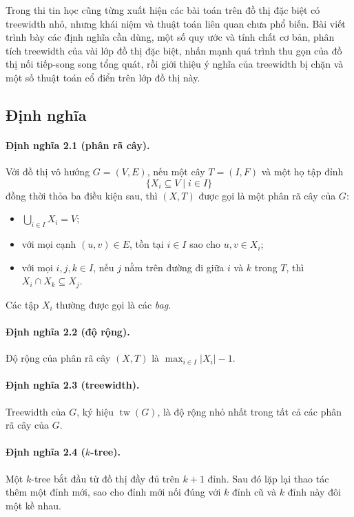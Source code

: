 \documentclass[11pt]{article}
\begin{document}
Trong thi tin học cũng từng xuất hiện các bài toán trên đồ thị đặc biệt có
treewidth nhỏ, nhưng khái niệm và thuật toán liên quan chưa phổ biến. Bài viết
trình bày các định nghĩa cần dùng, một số quy ước và tính chất cơ bản, phân
tích treewidth của vài lớp đồ thị đặc biệt, nhấn mạnh quá trình thu gọn của đồ
thị nối tiếp-song song tổng quát, rồi giới thiệu ý nghĩa của treewidth bị chặn
và một số thuật toán cổ điển trên lớp đồ thị này.

\subsection{Định nghĩa}

\paragraph{Định nghĩa 2.1 (phân rã cây).}
Với đồ thị vô hướng $G=(V,E)$, nếu một cây $T=(I,F)$ và một họ tập đỉnh
\[
  \{X_i\subseteq V\mid i\in I\}
\]
đồng thời thỏa ba điều kiện sau, thì $(X,T)$ được gọi là một phân rã cây của
$G$:
\begin{itemize}
  \item $\bigcup_{i\in I}X_i=V$;
  \item với mọi cạnh $(u,v)\in E$, tồn tại $i\in I$ sao cho $u,v\in X_i$;
  \item với mọi $i,j,k\in I$, nếu $j$ nằm trên đường đi giữa $i$ và $k$ trong
  $T$, thì $X_i\cap X_k\subseteq X_j$.
\end{itemize}
Các tập $X_i$ thường được gọi là các \emph{bag}.

\paragraph{Định nghĩa 2.2 (độ rộng).}
Độ rộng của phân rã cây $(X,T)$ là $\max_{i\in I}|X_i|-1$.

\paragraph{Định nghĩa 2.3 (treewidth).}
Treewidth của $G$, ký hiệu $\operatorname{tw}(G)$, là độ rộng nhỏ nhất trong
tất cả các phân rã cây của $G$.

\paragraph{Định nghĩa 2.4 ($k$-tree).}
Một $k$-tree bắt đầu từ đồ thị đầy đủ trên $k+1$ đỉnh. Sau đó lặp lại thao tác
thêm một đỉnh mới, sao cho đỉnh mới nối đúng với $k$ đỉnh cũ và $k$ đỉnh này
đôi một kề nhau.
\end{document}
